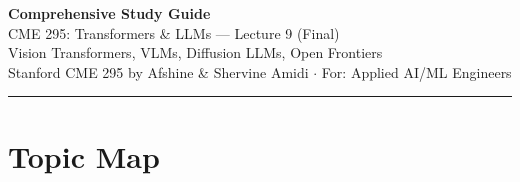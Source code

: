 \documentclass[11pt, a4paper]{article}
\begin{document}
\begin{center}
{\LARGE\bfseries\color{defblue} Comprehensive Study Guide}\\[6pt]
{\Large CME 295: Transformers \& LLMs --- Lecture 9 (Final)}\\[4pt]
{\normalsize Vision Transformers, VLMs, Diffusion LLMs, Open Frontiers}\\[4pt]
{\small Stanford CME 295 by Afshine \& Shervine Amidi $\cdot$ For: Applied AI/ML Engineers}\\[2pt]
\rule{\textwidth}{0.4pt}
\end{center}

\tableofcontents
\newpage

\section{Topic Map}
\end{document}
